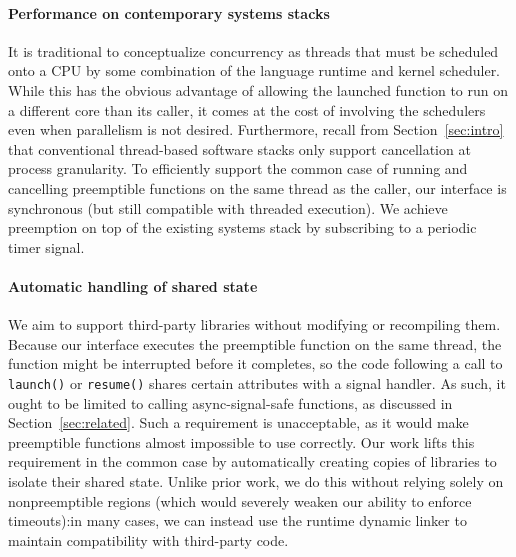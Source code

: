 \paragraph{Performance on contemporary systems stacks}
It is traditional to conceptualize concurrency as threads that must be scheduled onto
a CPU by some combination of the language runtime and kernel scheduler.  While this
has the obvious advantage of allowing the launched function to run on a different
core than its caller, it comes at the cost of involving the schedulers even when
parallelism is not desired.  Furthermore, recall from Section~\ref{sec:intro} that
conventional thread-based software stacks only support cancellation at process
granularity.  To efficiently support the common case of running and cancelling
preemptible functions on the same thread as the caller, our interface is synchronous
(but still compatible with threaded execution).  We achieve preemption on top of the
existing systems stack by subscribing to a periodic timer signal.

\paragraph{Automatic handling of shared state}
We aim to support third-party libraries
without modifying or recompiling them.
Because our interface executes the preemptible function on the same thread, the
function might be interrupted before it completes, so the code following a call to
\texttt{launch()} or \texttt{resume()} shares certain attributes with a signal
handler.  As
such, it ought to be limited to calling async-signal-safe functions, as
discussed in Section~\ref{sec:related}.  Such a requirement is unacceptable, as
it would make preemptible functions almost impossible to use correctly.  Our work
lifts this requirement in the common case by automatically creating copies of
libraries to isolate their shared state.
Unlike prior work, we do this without relying solely on nonpreemptible regions
(which would severely weaken our ability to enforce timeouts):\@ in many cases, we
can instead use the runtime dynamic linker to maintain compatibility
with third-party code.

